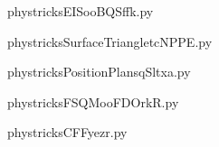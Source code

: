     

    \clearpage
    


    \newcommand{\CaptionFigEISooBQSffk}{<+Type your caption here+>}
    \begin{center}
        
    \end{center}
    phystricksEISooBQSffk.py

    

    \clearpage
    


    \newcommand{\CaptionFigSurfaceTriangletcNPPE}{<+Type your caption here+>}
    \begin{center}
        
    \end{center}
    phystricksSurfaceTriangletcNPPE.py

    

    \clearpage
    


    \newcommand{\CaptionFigPositionPlansqSltxa}{<+Type your caption here+>}
    \begin{center}
        
    \end{center}
    phystricksPositionPlansqSltxa.py

    

    \clearpage
    


    \newcommand{\CaptionFigFSQMooFDOrkR}{<+Type your caption here+>}
    \begin{center}
        
    \end{center}
    phystricksFSQMooFDOrkR.py

    

    \clearpage
    


    \newcommand{\CaptionFigCFFyezr}{<+Type your caption here+>}
    \begin{center}
        
    \end{center}
    phystricksCFFyezr.py

    

    \clearpage
    

